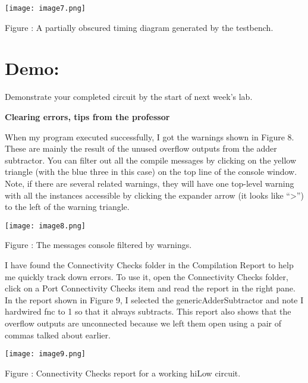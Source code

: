 \texttt{[image:  image7.png]}

Figure : A partially obscured timing diagram generated by the testbench.

\hypertarget{demo}{%
\section{Demo:}\label{demo}}

Demonstrate your completed circuit by the start of next week's lab.

\textbf{\hfill\break
}

\textbf{Clearing errors, tips from the professor}

When my program executed successfully, I got the warnings shown in
Figure 8. These are mainly the result of the unused overflow outputs
from the adder subtractor. You can filter out all the compile messages
by clicking on the yellow triangle (with the blue three in this case) on
the top line of the console window. Note, if there are several related
warnings, they will have one top-level warning with all the instances
accessible by clicking the expander arrow (it looks like
``\textgreater'') to the left of the warning triangle.

\texttt{[image:  image8.png]}

Figure : The messages console filtered by warnings.

I have found the Connectivity Checks folder in the Compilation Report to
help me quickly track down errors. To use it, open the Connectivity
Checks folder, click on a Port Connectivity Checks item and read the
report in the right pane. In the report shown in Figure 9, I selected
the genericAdderSubtractor and note I hardwired fnc to 1 so that it
always subtracts. This report also shows that the overflow outputs are
unconnected because we left them open using a pair of commas talked
about earlier.

\texttt{[image:  image9.png]}

Figure : Connectivity Checks report for a working hiLow circuit.



